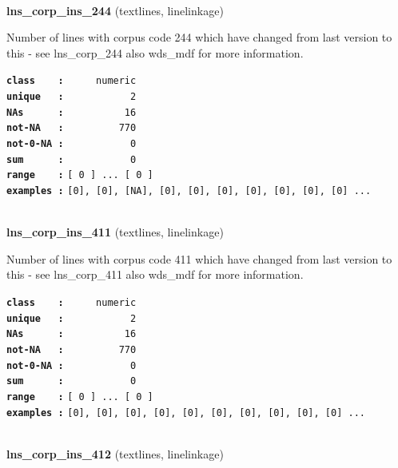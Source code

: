 \documentclass[]{article}
\begin{document}
~

\textbf{lns\_corp\_ins\_244} (textlines, linelinkage)

Number of lines with corpus code 244 which have changed from last
version to this - see lns\_corp\_244 also wds\_mdf for more information.

\textbf{\texttt{class\ \ \ \ :}} \texttt{~~~~~numeric}\\
\textbf{\texttt{unique\ \ \ :}} \texttt{~~~~~~~~~~~2}\\
\textbf{\texttt{NAs\ \ \ \ \ \ :}} \texttt{~~~~~~~~~~16}\\
\textbf{\texttt{not-NA\ \ \ :}} \texttt{~~~~~~~~~770}\\
\textbf{\texttt{not-0-NA\ :}} \texttt{~~~~~~~~~~~0}\\
\textbf{\texttt{sum\ \ \ \ \ \ :}} \texttt{~~~~~~~~~~~0}\\
\textbf{\texttt{range\ \ \ \ :}}
\texttt{{[}\ 0\ {]}\ ...\ {[}\ 0\ {]}}\\
\textbf{\texttt{examples\ :}}
\texttt{{[}0{]},\ {[}0{]},\ {[}NA{]},\ {[}0{]},\ {[}0{]},\ {[}0{]},\ {[}0{]},\ {[}0{]},\ {[}0{]},\ {[}0{]}\ ...}\\

~

\textbf{lns\_corp\_ins\_411} (textlines, linelinkage)

Number of lines with corpus code 411 which have changed from last
version to this - see lns\_corp\_411 also wds\_mdf for more information.

\textbf{\texttt{class\ \ \ \ :}} \texttt{~~~~~numeric}\\
\textbf{\texttt{unique\ \ \ :}} \texttt{~~~~~~~~~~~2}\\
\textbf{\texttt{NAs\ \ \ \ \ \ :}} \texttt{~~~~~~~~~~16}\\
\textbf{\texttt{not-NA\ \ \ :}} \texttt{~~~~~~~~~770}\\
\textbf{\texttt{not-0-NA\ :}} \texttt{~~~~~~~~~~~0}\\
\textbf{\texttt{sum\ \ \ \ \ \ :}} \texttt{~~~~~~~~~~~0}\\
\textbf{\texttt{range\ \ \ \ :}}
\texttt{{[}\ 0\ {]}\ ...\ {[}\ 0\ {]}}\\
\textbf{\texttt{examples\ :}}
\texttt{{[}0{]},\ {[}0{]},\ {[}0{]},\ {[}0{]},\ {[}0{]},\ {[}0{]},\ {[}0{]},\ {[}0{]},\ {[}0{]},\ {[}0{]}\ ...}\\

~

\textbf{lns\_corp\_ins\_412} (textlines, linelinkage)
\end{document}
